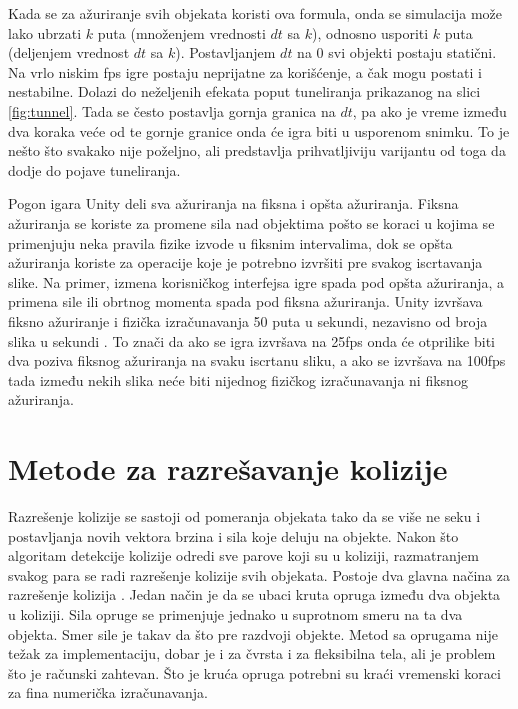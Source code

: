 \documentclass[12pt,oneside]{memoir}
\begin{document}
Kada se za ažuriranje svih objekata koristi ova formula, onda se simulacija može lako ubrzati $k$ puta
(množenjem vrednosti $dt$ sa $k$), odnosno usporiti $k$ puta (deljenjem vrednost $dt$ sa $k$).
Postavljanjem $dt$ na 0 svi objekti postaju statični. 
Na vrlo niskim fps igre postaju neprijatne za korišćenje, a čak mogu postati i nestabilne.
Dolazi do neželjenih efekata poput tuneliranja prikazanog na slici \ref{fig:tunnel}.
Tada se često postavlja gornja granica na $dt$, pa 
ako je vreme između dva koraka veće od te gornje granice onda će igra biti u usporenom snimku.
To je nešto što svakako nije poželjno, ali predstavlja prihvatljiviju varijantu od toga da dodje do pojave tuneliranja.

Pogon igara Unity deli sva ažuriranja na fiksna i opšta ažuriranja. 
Fiksna ažuriranja se koriste za promene sila nad objektima 
pošto se koraci u kojima se primenjuju neka pravila fizike izvode u fiksnim intervalima, 
dok se opšta ažuriranja koriste za operacije koje je potrebno izvršiti pre svakog iscrtavanja slike. 
Na primer, izmena korisničkog interfejsa igre spada pod opšta ažuriranja, a primena sile ili obrtnog momenta spada pod fiksna ažuriranja.
Unity izvršava fiksno ažuriranje i fizička izračunavanja 50 puta u sekundi, nezavisno od broja slika u sekundi \cite{unity}.
To znači da ako se igra izvršava na 25fps onda će otprilike biti dva poziva fiksnog ažuriranja na svaku iscrtanu sliku,
a ako se izvršava na 100fps tada između nekih slika neće biti nijednog fizičkog izračunavanja ni fiksnog ažuriranja.

\section{Metode za razrešavanje kolizije}
\label{sec:razresenje}

Razrešenje kolizije se sastoji od
pomeranja objekata tako da se više ne seku i postavljanja novih vektora brzina i sila koje deluju na objekte.
Nakon što algoritam detekcije kolizije odredi sve parove koji su u koliziji, 
razmatranjem svakog para se radi razrešenje kolizije svih objekata.
Postoje dva glavna načina za razrešenje kolizija \cite{Moore}.
Jedan način je da se ubaci kruta opruga između dva objekta u koliziji.
Sila opruge se primenjuje jednako u suprotnom smeru na ta dva objekta.
Smer sile je takav da što pre razdvoji objekte. Metod sa oprugama nije težak 
za implementaciju, dobar je i za čvrsta i za fleksibilna tela, ali je problem što je računski zahtevan. 
Što je kruća opruga potrebni su kraći vremenski koraci za fina numerička izračunavanja.
\end{document}
